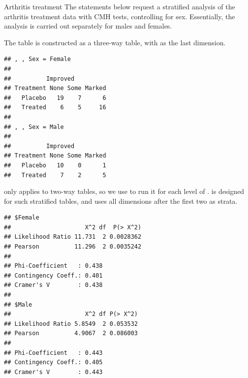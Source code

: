 \documentclass[11pt]{book}
\renewenvironment{knitrout}{\small\renewcommand{\baselinestretch}{.85}}{} %
\begin{document}
\begin{Example}[arthrit3]{Arthritis treatment}
The statements below request a stratified analysis of the arthritis
treatment data
with CMH tests,
controlling for sex.  Essentially, the analysis is carried out
separately for males and females.

The table  is constructed as a three-way table,
with  as the last dimension.
\begin{knitrout}
\color{fgcolor}\begin{kframe}
\begin{alltt}
 \hlkwb{<-} \hlstd{(}\hlopt{~} \hlopt{+}  \hlopt{+}  
\end{alltt}
\begin{verbatim}
## , , Sex = Female
## 
##          Improved
## Treatment None Some Marked
##   Placebo   19    7      6
##   Treated    6    5     16
## 
## , , Sex = Male
## 
##          Improved
## Treatment None Some Marked
##   Placebo   10    0      1
##   Treated    7    2      5
\end{verbatim}
\end{kframe}
\end{knitrout}
 only applies to two-way tables, so we use
 to run it for each level of .  
 is designed for such stratified tables, and
uses all dimensions after the first two as strata.
\begin{knitrout}
\color{fgcolor}\begin{kframe}
\begin{alltt}
 \hlstd{=}\hlstd{,} 
\end{alltt}
\begin{verbatim}
## $Female
##                     X^2 df  P(> X^2)
## Likelihood Ratio 11.731  2 0.0028362
## Pearson          11.296  2 0.0035242
## 
## Phi-Coefficient   : 0.438 
## Contingency Coeff.: 0.401 
## Cramer's V        : 0.438 
## 
## $Male
##                     X^2 df P(> X^2)
## Likelihood Ratio 5.8549  2 0.053532
## Pearson          4.9067  2 0.086003
## 
## Phi-Coefficient   : 0.443 
## Contingency Coeff.: 0.405 
## Cramer's V        : 0.443
\end{verbatim}
\end{kframe}
\end{knitrout}

\end{Example}
\end{document}

